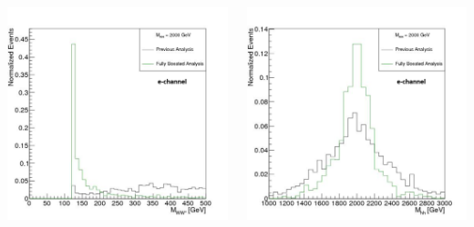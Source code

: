 \documentclass{beamer}
\newcommand*{\header}[1]{\fontsize{16}{8}\selectfont \textbf{{\color{MyPurple}{#1}}}}
\begin{document}
\begin{frame}
\begin{center}
\header{Signal Reconstruction}
\end{center}
\begin{columns}
\begin{column}{0.5\textwidth}
\includegraphics[width=01\textwidth]{figures/electron/mww_e}
\end{column}
\begin{column}{0.5\textwidth}
\includegraphics[width=01\textwidth]{figures/electron/mhh_e}
\end{column}
\end{columns}
\end{frame}
\end{document}
